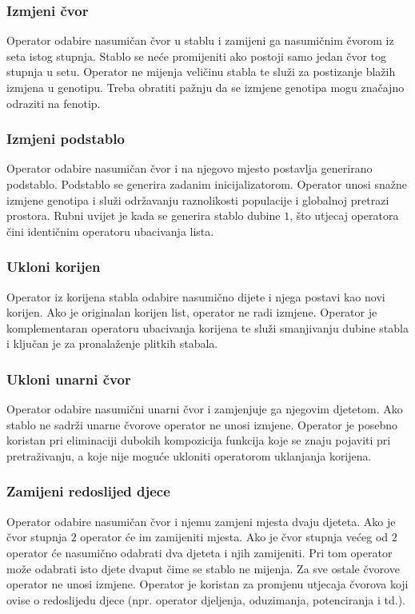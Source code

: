 \documentclass[times, utf8, numeric, diplomski]{fer}
\begin{document}
\subsubsection{Izmjeni čvor}
Operator odabire nasumičan čvor u stablu i zamijeni ga nasumičnim čvorom iz seta istog stupnja. Stablo se neće promijeniti ako postoji samo jedan čvor tog stupnja u setu. Operator ne mijenja veličinu stabla te služi za postizanje blažih izmjena u genotipu. Treba obratiti pažnju da se izmjene genotipa mogu značajno odraziti na fenotip.

\subsubsection{Izmjeni podstablo}
Operator odabire nasumičan čvor i na njegovo mjesto postavlja generirano podstablo. Podstablo se generira zadanim inicijalizatorom. Operator unosi snažne izmjene genotipa i služi održavanju raznolikosti populacije i globalnoj pretrazi prostora. Rubni uvijet je kada se generira stablo dubine $1$, što utjecaj operatora čini identičnim operatoru ubacivanja lista.

\subsubsection{Ukloni korijen}
Operator iz korijena stabla odabire nasumično dijete i njega postavi kao novi korijen. Ako je originalan korijen list, operator ne radi izmjene. Operator je komplementaran operatoru ubacivanja korijena te služi smanjivanju dubine stabla i ključan je za pronalaženje plitkih stabala.

\subsubsection{Ukloni unarni čvor}
Operator odabire nasumični unarni čvor i zamjenjuje ga njegovim djetetom. Ako stablo ne sadrži unarne čvorove operator ne unosi izmjene. Operator je posebno koristan pri eliminaciji dubokih kompozicija funkcija koje se znaju pojaviti pri pretraživanju, a koje nije moguće ukloniti operatorom uklanjanja korijena.

\subsubsection{Zamijeni redoslijed djece}
Operator odabire nasumičan čvor i njemu zamjeni mjesta dvaju djeteta. Ako je čvor stupnja $2$ operator će im zamijeniti mjesta. Ako je čvor stupnja većeg od $2$ operator će nasumično odabrati dva djeteta i njih zamijeniti. Pri tom operator može odabrati isto djete dvaput čime se stablo ne mijenja. Za sve ostale čvorove operator ne unosi izmjene. Operator je koristan za promjenu utjecaja čvorova koji ovise o redoslijedu djece (npr. operator djeljenja, oduzimanja, potenciranja i td.).
\end{document}
